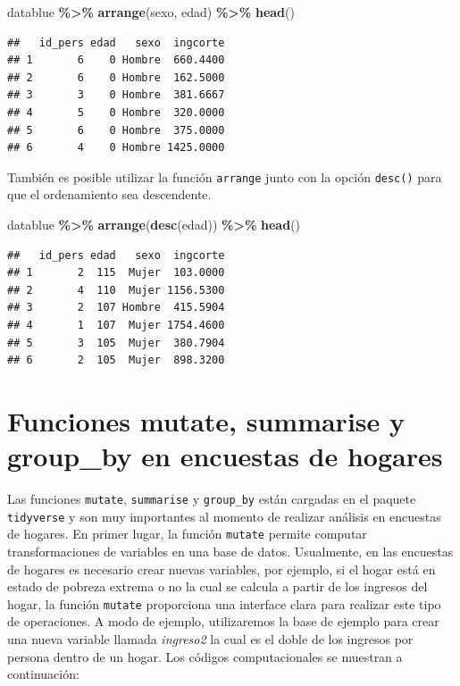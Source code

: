 \documentclass[
  12pt,
]{book}
\newenvironment{Shaded}{\begin{snugshade}}{\end{snugshade}}
\newcommand{\FunctionTok}[1]{\textcolor[rgb]{0.13,0.29,0.53}{\textbf{#1}}}
\newcommand{\NormalTok}[1]{#1}
\newcommand{\SpecialCharTok}[1]{\textcolor[rgb]{0.81,0.36,0.00}{\textbf{#1}}}
\begin{document}
\begin{Shaded}
\begin{Highlighting}[]
\NormalTok{datablue }\SpecialCharTok{\%\textgreater{}\%} \FunctionTok{arrange}\NormalTok{(sexo, edad) }\SpecialCharTok{\%\textgreater{}\%} \FunctionTok{head}\NormalTok{()}
\end{Highlighting}
\end{Shaded}

\begin{verbatim}
##   id_pers edad   sexo  ingcorte
## 1       6    0 Hombre  660.4400
## 2       6    0 Hombre  162.5000
## 3       3    0 Hombre  381.6667
## 4       5    0 Hombre  320.0000
## 5       6    0 Hombre  375.0000
## 6       4    0 Hombre 1425.0000
\end{verbatim}

También es posible utilizar la función \texttt{arrange} junto con la opción \texttt{desc()} para que el ordenamiento sea descendente.

\begin{Shaded}
\begin{Highlighting}[]
\NormalTok{datablue }\SpecialCharTok{\%\textgreater{}\%} \FunctionTok{arrange}\NormalTok{(}\FunctionTok{desc}\NormalTok{(edad)) }\SpecialCharTok{\%\textgreater{}\%} \FunctionTok{head}\NormalTok{()}
\end{Highlighting}
\end{Shaded}

\begin{verbatim}
##   id_pers edad   sexo  ingcorte
## 1       2  115  Mujer  103.0000
## 2       4  110  Mujer 1156.5300
## 3       2  107 Hombre  415.5904
## 4       1  107  Mujer 1754.4600
## 5       3  105  Mujer  380.7904
## 6       2  105  Mujer  898.3200
\end{verbatim}

\section{\texorpdfstring{Funciones \textbf{mutate, summarise y group\_by} en encuestas de hogares}{Funciones mutate, summarise y group\_by en encuestas de hogares}}\label{funciones-mutate-summarise-y-group_by-en-encuestas-de-hogares}

Las funciones \texttt{mutate}, \texttt{summarise} y \texttt{group\_by} están cargadas en el paquete \texttt{tidyverse} y son muy importantes al momento de realizar análisis en encuestas de hogares. En primer lugar, la función \texttt{mutate} permite computar transformaciones de variables en una base de datos. Usualmente, en las encuestas de hogares es necesario crear nuevas variables, por ejemplo, si el hogar está en estado de pobreza extrema o no la cual se calcula a partir de los ingresos del hogar, la función \texttt{mutate} proporciona una interface clara para realizar este tipo de operaciones. A modo de ejemplo, utilizaremos la base de ejemplo para crear una nueva variable llamada \emph{ingreso2} la cual es el doble de los ingresos por persona dentro de un hogar. Los códigos computacionales se muestran a continuación:
\end{document}
